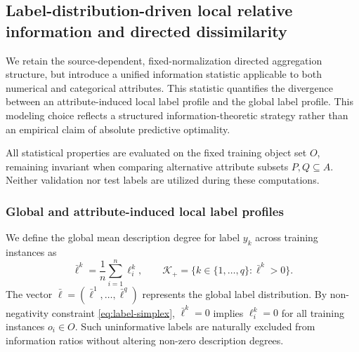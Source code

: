 
\subsection{Label-distribution-driven local relative information and directed dissimilarity}
\label{subsec:ldl-directed}

We retain the source-dependent, fixed-normalization directed aggregation structure, but introduce a unified information statistic applicable to both numerical and categorical attributes. This statistic quantifies the divergence between an attribute-induced local label profile and the global label profile. This modeling choice reflects a structured information-theoretic strategy rather than an empirical claim of absolute predictive optimality.

All statistical properties are evaluated on the fixed training object set $O$, remaining invariant when comparing alternative attribute subsets $P, Q \subseteq A$. Neither validation nor test labels are utilized during these computations.

\subsubsection{Global and attribute-induced local label profiles}
We define the global mean description degree for label $y_k$ across training instances as
\begin{equation}
	\bar{\ell}^k = \frac{1}{n} \sum_{i=1}^n \ell_i^k, \qquad \mathcal{K}_+ = \{k \in \{1,\dots,q\} : \bar{\ell}^k > 0\}.
	\label{eq:global-label-profile}
\end{equation}
The vector $\bar{\boldsymbol{\ell}} = (\bar{\ell}^1, \dots, \bar{\ell}^q)$ represents the global label distribution. By non-negativity constraint \eqref{eq:label-simplex}, $\bar{\ell}^k = 0$ implies $\ell_i^k = 0$ for all training instances $o_i \in O$. Such uninformative labels are naturally excluded from information ratios without altering non-zero description degrees.

